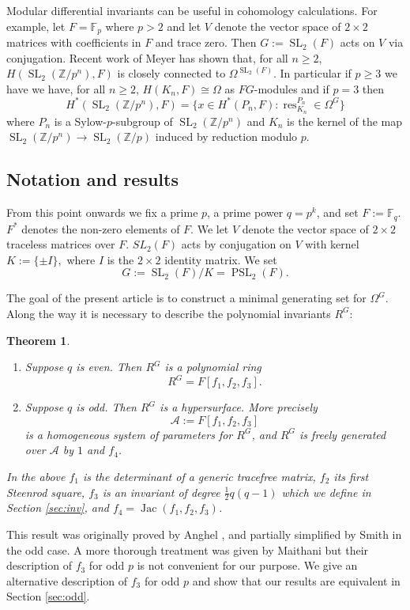 \documentclass[a4paper]{amsart}
\newcommand{\F}{\mathbb{F}}
\newcommand{\Z}{\mathbb{Z}}
\def\SL{\operatorname{SL}}
\def\PSL{\operatorname{PSL}}
\def\res{\operatorname{res}}
\def\Z{\mathbb{Z}}
\def\Jac{\operatorname{Jac}}
\newtheorem{Theorem}[Lemma]{Theorem}
\newtheorem*{Corollary of Conjecture}{Corollary of Conjecture}
\theoremstyle{definition}
\theoremstyle{remark}
\theoremstyle{Acknowledgments}
\begin{document}
Modular differential invariants can be useful in cohomology calculations. For example, let $F = \F_p$ where $p>2$ and let $V$ denote the vector space of $2 \times 2$ matrices with coefficients in $F$ and trace zero. Then $G:=\SL_2(F)$ acts on $V$ via conjugation.  Recent work of Meyer \cite{Meyer3} has shown that, for all $n \geq 2$, $H(\SL_2(\Z/p^n), F)$ is closely connected to $\Omega^{\SL_2(F)}$. In particular if $p \geq 3$ we have we have, for all $n \geq 2$, $H(K_n, F) \cong \Omega$ as $FG$-modules and if $p=3$ then
\[H^*(\SL_2(\Z/p^n), F) = \{x \in H^*(P_n, F): \res^{P_n}_{K_n} \in \Omega^G\}\]
where $P_n$ is a Sylow-$p$-subgroup of $\SL_2(\Z/p^n)$ and $K_n$ is the kernel of the map $\SL_2(\Z/p^n) \rightarrow \SL_2(\Z/p)$ induced by reduction modulo $p$. 

\subsection{Notation and results}\label{sec:not}

From this point onwards we fix a prime $p$, a prime power $q=p^k$, and set $F:= \F_q$. $F^*$ denotes the non-zero elements of $F$. We let $V$ denote the vector space of $2 \times 2$ traceless matrices over $F$. $SL_2(F)$ acts by conjugation on $V$ with kernel  $K:= \{\pm I \},$ where $I$ is the $2 \times 2$ identity matrix. We set
\[G:= \SL_2(F)/K = \PSL_2(F).\]

The goal of the present article is to construct a minimal generating set for $\Omega^G$. Along the way it is necessary to describe the polynomial invariants $R^G$:

\begin{Theorem}\label{invars}\
\begin{enumerate}
\item[(a)] Suppose $q$ is even. Then $R^G$ is a polynomial ring
\[R^G = F[f_1,f_2,f_3].\]
\item[(b)] Suppose $q$ is odd. Then $R^G$ is a hypersurface. More precisely
\[\mathcal{A}:= F[f_1,f_2,f_3]\]
is a homogeneous system of parameters for $R^G$, and $R^G$ is freely generated over $\mathcal{A}$ by $1$ and $f_4$.
\end{enumerate}
In the above $f_1$ is the determinant of a generic tracefree matrix, $f_2$ its first Steenrod square, $f_3$ is an invariant of degree $\frac12 q(q-1)$ which we define in Section \ref{sec:inv}, and $f_4 = \Jac(f_1,f_2,f_3)$.
\end{Theorem}
This result was originally proved by Anghel \cite{Anghel}, and partially simplified by Smith \cite{Smith2x2} in the odd case. A more thorough treatment was given by Maithani \cite{Maithani} but their description of $f_3$ for odd $p$ is not convenient for our purpose. We give an alternative description of $f_3$ for odd $p$ and show that our results are equivalent in Section \ref{sec:odd}.
\end{document}
